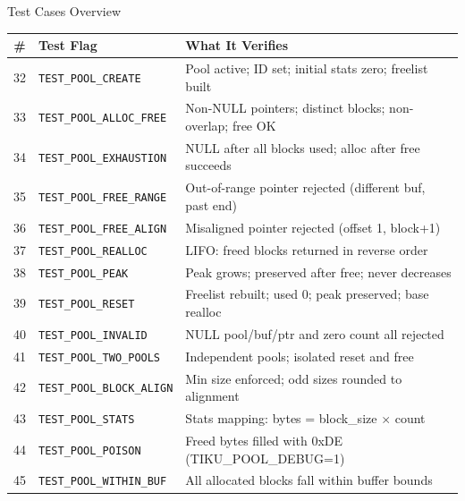 \documentclass[aspectratio=169, 10pt]{beamer}
\begin{document}
\begin{frame}{Test Cases Overview}
\begin{table}
\centering
\small
\begin{tabular}{@{}clp{7cm}@{}}
\toprule
\textbf{\#} & \textbf{Test Flag} & \textbf{What It Verifies} \\
\midrule
32 & \texttt{TEST\_POOL\_CREATE}     & Pool active; ID set; initial stats zero; freelist built \\
33 & \texttt{TEST\_POOL\_ALLOC\_FREE}& Non-NULL pointers; distinct blocks; non-overlap; free OK \\
34 & \texttt{TEST\_POOL\_EXHAUSTION} & NULL after all blocks used; alloc after free succeeds \\
35 & \texttt{TEST\_POOL\_FREE\_RANGE}& Out-of-range pointer rejected (different buf, past end) \\
36 & \texttt{TEST\_POOL\_FREE\_ALIGN}& Misaligned pointer rejected (offset 1, block+1) \\
37 & \texttt{TEST\_POOL\_REALLOC}    & LIFO: freed blocks returned in reverse order \\
38 & \texttt{TEST\_POOL\_PEAK}       & Peak grows; preserved after free; never decreases \\
39 & \texttt{TEST\_POOL\_RESET}      & Freelist rebuilt; used 0; peak preserved; base realloc \\
40 & \texttt{TEST\_POOL\_INVALID}    & NULL pool/buf/ptr and zero count all rejected \\
41 & \texttt{TEST\_POOL\_TWO\_POOLS} & Independent pools; isolated reset and free \\
42 & \texttt{TEST\_POOL\_BLOCK\_ALIGN}& Min size enforced; odd sizes rounded to alignment \\
43 & \texttt{TEST\_POOL\_STATS}      & Stats mapping: bytes = block\_size $\times$ count \\
44 & \texttt{TEST\_POOL\_POISON}     & Freed bytes filled with 0xDE (TIKU\_POOL\_DEBUG=1) \\
45 & \texttt{TEST\_POOL\_WITHIN\_BUF}& All allocated blocks fall within buffer bounds \\
\bottomrule
\end{tabular}
\end{table}
\end{frame}
\end{document}

